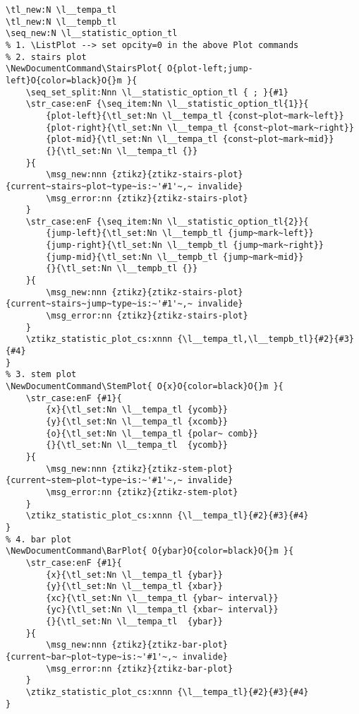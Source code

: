 \begin{verbatim}
\tl_new:N \l__tempa_tl
\tl_new:N \l__tempb_tl
\seq_new:N \l__statistic_option_tl
% 1. \ListPlot --> set opcity=0 in the above Plot commands
% 2. stairs plot
\NewDocumentCommand\StairsPlot{ O{plot-left;jump-left}O{color=black}O{}m }{
    \seq_set_split:Nnn \l__statistic_option_tl { ; }{#1}
    \str_case:enF {\seq_item:Nn \l__statistic_option_tl{1}}{
        {plot-left}{\tl_set:Nn \l__tempa_tl {const~plot~mark~left}}
        {plot-right}{\tl_set:Nn \l__tempa_tl {const~plot~mark~right}}
        {plot-mid}{\tl_set:Nn \l__tempa_tl {const~plot~mark~mid}}
        {}{\tl_set:Nn \l__tempa_tl {}}
    }{ 
        \msg_new:nnn {ztikz}{ztikz-stairs-plot}{current~stairs~plot~type~is:~'#1'~,~ invalide}
        \msg_error:nn {ztikz}{ztikz-stairs-plot}
    }
    \str_case:enF {\seq_item:Nn \l__statistic_option_tl{2}}{
        {jump-left}{\tl_set:Nn \l__tempb_tl {jump~mark~left}}
        {jump-right}{\tl_set:Nn \l__tempb_tl {jump~mark~right}}
        {jump-mid}{\tl_set:Nn \l__tempb_tl {jump~mark~mid}}
        {}{\tl_set:Nn \l__tempb_tl {}}
    }{ 
        \msg_new:nnn {ztikz}{ztikz-stairs-plot}{current~stairs~jump~type~is:~'#1'~,~ invalide}
        \msg_error:nn {ztikz}{ztikz-stairs-plot}
    }
    \ztikz_statistic_plot_cs:xnnn {\l__tempa_tl,\l__tempb_tl}{#2}{#3}{#4}
}
% 3. stem plot
\NewDocumentCommand\StemPlot{ O{x}O{color=black}O{}m }{
    \str_case:enF {#1}{
        {x}{\tl_set:Nn \l__tempa_tl {ycomb}}
        {y}{\tl_set:Nn \l__tempa_tl {xcomb}}
        {o}{\tl_set:Nn \l__tempa_tl {polar~ comb}}
        {}{\tl_set:Nn \l__tempa_tl  {ycomb}}
    }{ 
        \msg_new:nnn {ztikz}{ztikz-stem-plot}{current~stem~plot~type~is:~'#1'~,~ invalide}
        \msg_error:nn {ztikz}{ztikz-stem-plot}
    }
    \ztikz_statistic_plot_cs:xnnn {\l__tempa_tl}{#2}{#3}{#4}
}
% 4. bar plot
\NewDocumentCommand\BarPlot{ O{ybar}O{color=black}O{}m }{
    \str_case:enF {#1}{
        {x}{\tl_set:Nn \l__tempa_tl {ybar}}
        {y}{\tl_set:Nn \l__tempa_tl {xbar}}
        {xc}{\tl_set:Nn \l__tempa_tl {ybar~ interval}}
        {yc}{\tl_set:Nn \l__tempa_tl {xbar~ interval}}
        {}{\tl_set:Nn \l__tempa_tl  {ybar}}
    }{ 
        \msg_new:nnn {ztikz}{ztikz-bar-plot}{current~bar~plot~type~is:~'#1'~,~ invalide}
        \msg_error:nn {ztikz}{ztikz-bar-plot}
    }
    \ztikz_statistic_plot_cs:xnnn {\l__tempa_tl}{#2}{#3}{#4}
}
\end{verbatim}

